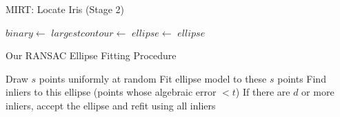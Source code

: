 \begin{algorithm}[!h]
\begin{dBox}
	\caption{MIRT: Locate Iris (Stage 2)} \label{mirt_iris_algo}
	\begin{algorithmic}[1]
		\State $binary \gets$ 
		\State {}
		\State {}
		\State $largestcontour \gets$ 
		\State $ellipse \gets$ 
		\State \Return $ellipse$
		\EndProcedure	
	\end{algorithmic}
\end{dBox}	
\end{algorithm}


\begin{algorithm}
\begin{dBox}
	\caption{Our RANSAC Ellipse Fitting Procedure} \label{our_ransac}
	\begin{algorithmic}[1]
			\State Draw $s$ points uniformly at random
			\State Fit ellipse model to these $s$ points
			\State Find inliers to this ellipse (points whose algebraic error $ < t$)
			\State If there are $d$ or more inliers, accept the ellipse and refit using all inliers	
		\EndWhile	
		\EndProcedure	
	\end{algorithmic}
\end{dBox}	
\end{algorithm}
